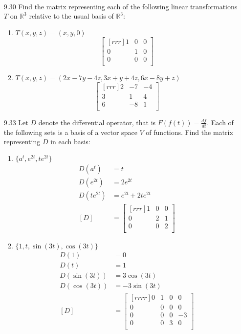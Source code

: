 \documentclass[12pt]{article}
\theoremstyle{definition}
\theoremstyle{plain}
\begin{document}
\begin{enumerate}
\begin{enumerate}
\begin{align*}
		\end{align*}
	\end{enumerate}
\pagebreak
\item[9.30]Find the matrix representing each of the following linear transformations $T$ on $\mathbb{R}^3$ relative to the usual basis of $\mathbb{R}^3$:
	\begin{enumerate}
	\item $T(x,y,z)=(x,y,0)$
		\[ \begin{bmatrix}[rrr]1&0&0\\0&1&0\\0&0&0\\\end{bmatrix} \]
	\item $T(x,y,z)=(2x-7y-4z,3x+y+4z,6x-8y+z)$
		\[ \begin{bmatrix}[rrr]2&-7&-4\\3&1&4\\6&-8&1\\\end{bmatrix} \]
	\end{enumerate}
\item[9.33]Let $D$ denote the differential operator, that is $F(f(t))=\frac{df}{dt}$. Each of the following sets is a basis of a vector space $V$ of functions. Find the matrix representing $D$ in each basis:
	\begin{enumerate}
	\item $\{a^t,e^{2t},te^{2t}\}$
		\begin{align*}
		D(a^t)&=t\\
		D(e^{2t})&=2e^{2t}\\
		D(te^{2t})&=e^{2t}+2te^{2t}\\
		[D] &= \begin{bmatrix}[rrr]1&0&0\\0&2&1\\0&0&2\\\end{bmatrix}
		\end{align*}
	\item $\{1,t,\sin(3t),\cos(3t)\}$
		\begin{align*}
		D(1)&=0\\
		D(t)&=1\\
		D(\sin(3t))&=3\cos(3t)\\
		D(\cos(3t))&=-3\sin(3t)\\
		[D] &= \begin{bmatrix}[rrrr]0&1&0&0\\0&0&0&0\\0&0&0&-3\\0&0&3&0\\\end{bmatrix}

\end{align*}
\end{enumerate}
\end{enumerate}
\end{document}
